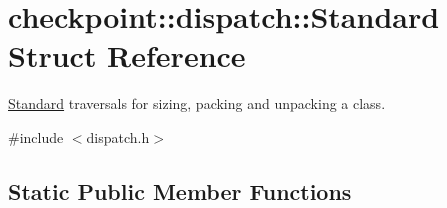 \hypertarget{structcheckpoint_1_1dispatch_1_1_standard}{}\section{checkpoint\+:\+:dispatch\+:\+:Standard Struct Reference}
\label{structcheckpoint_1_1dispatch_1_1_standard}


\hyperlink{structcheckpoint_1_1dispatch_1_1_standard}{Standard} traversals for sizing, packing and unpacking a class.  




{\ttfamily \#include $<$dispatch.\+h$>$}

\subsection*{Static Public Member Functions}
